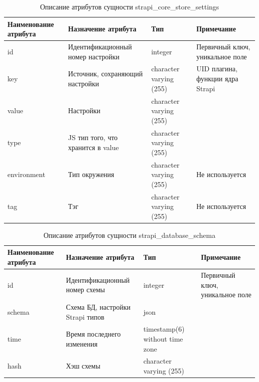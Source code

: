\documentclass{mirea}
\begin{document}
	\begin{longtable}{ |p{}|p{}|p{}|p{}| } 
		\caption{Описание атрибутов сущности strapi\_core\_store\_settings}
		\endfirsthead
		\endhead
		\hline
		Наименование атрибута & Назначение атрибута & Тип & Примечание \\ \hline
		
		id & Идентификацион\-ный номер настройки & integer & Первичный ключ, уникальное поле \\ \hline
		
		key & Источник, сохраняющий настройки & character varying (255) & UID плагина, функции ядра Strapi \\ \hline
		
		value & Настройки  & character varying (255) & \\ \hline
		
		type & JS тип того, что хранится в value & character varying (255) & \\ \hline
		
		environment & Тип окружения & character varying (255) & Не используется \\ \hline
		
		tag & Тэг & character varying (255) & Не используется \\ \hline
		
	\end{longtable}

	\begin{longtable}{ |p{}|p{}|p{}|p{}| } 
		\caption{Описание атрибутов сущности strapi\_database\_schema}
		\endfirsthead
		\endhead
		\hline
		Наименование атрибута & Назначение атрибута & Тип & Примечание \\ \hline
		
		id & Идентификацион\-ный номер схемы & integer & Первичный ключ, уникальное поле \\ \hline
		
		schema & Схема БД, настройки Strapi типов & json & \\ \hline
		
		time & Время последнего изменения  & timestamp(6) without time zone & \\ \hline
		
		hash & Хэш схемы & character varying (255) & \\ \hline
		
	\end{longtable}
	
\end{document}
